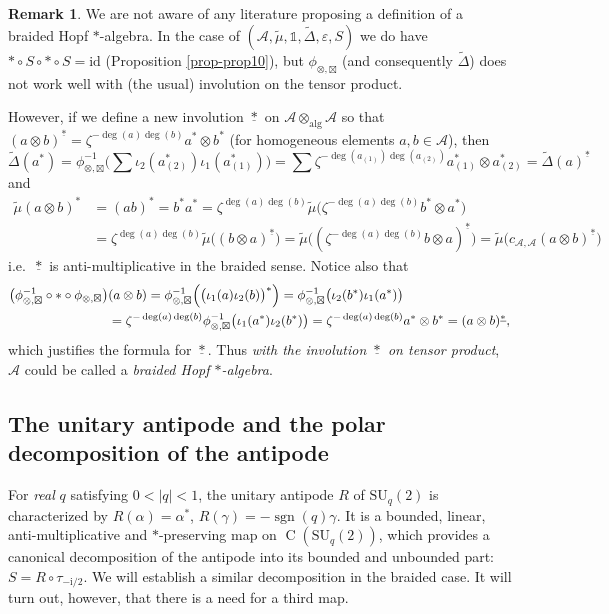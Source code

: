 \documentclass[12pt,reqno,a4paper]{amsart}
\theoremstyle{definition}
\newtheorem{remark}[proposition]{Remark}
\newcommand{\comp}{\circ}
\newcommand{\eps}{\varepsilon}
\newcommand{\I}{\mathds{1}}
\newcommand{\id}{\mathrm{id}}
\newcommand{\ii}{\mathrm{i}}
\newcommand{\tens}{\otimes}
\newcommand{\algtens}{\otimes_{\textrm{alg}}}
\newcommand{\cA}{\mathscr{A}}
\DeclareMathOperator{\C}{C}
\newcommand{\SU}{\mathrm{SU}}
\numberwithin{equation}{section}
\begin{document}
\begin{remark}
We are not aware of any literature proposing a definition of a braided Hopf $*$-algebra. In the case of $(\cA,\widetilde{\mu},\I,\widetilde{\Delta},\eps,S)$ we do have $*\comp S\comp *\comp S=\id$ (Proposition \ref{prop-prop10}), but $\phi_{\tens,\boxtimes}$ (and consequently $\widetilde{\Delta}$) does not work well with (the usual) involution on the tensor product.

However, if we define a new involution $\underline{\ast}$ on $\cA\algtens\cA$ so that $(a\tens b)^{\underline{\ast}}=\zeta^{-\deg(a)\deg(b)}a^*\tens b^*$ (for homogeneous elements $a,b\in\cA$), then
\[
\widetilde{\Delta}(a^*)
=\phi_{\tens,\boxtimes}^{-1}\biggl(\sum\iota_2(a_{(2)}^*)\iota_1(a_{(1)}^*)\biggr)
=\sum\zeta^{-\deg(a_{(1)})\deg(a_{(2)})}a_{(1)}^*\tens a_{(2)}^*
=\widetilde{\Delta}(a)^{\underline{\ast}}
\]
and
\begin{align*}
\widetilde{\mu}(a\tens b)^*&=(ab)^*=b^*a^*=
\zeta^{\deg(a)\deg(b)}\widetilde{\mu}\bigl(\zeta^{-\deg(a)\deg(b)} b^*\tens a^*\bigr)\\
&=\zeta^{\deg(a)\deg(b)}\widetilde{\mu}\bigl((b\tens a)^{\underline{\ast}}\bigr)
=\widetilde{\mu}\bigl(
(\zeta^{-\deg(a)\deg(b)}b\tens a)^{\underline{\ast}}\bigr)
=\widetilde{\mu}\bigl(
c_{\cA,\cA}(a\tens b)^{\underline{\ast}}\bigr)
\end{align*}
i.e.~$\underline{\ast}$ is anti-multiplicative in the braided sense.
Notice also that
\begin{align*}
\bigl(\phi_{\tens,\boxtimes}^{-1}\comp\ast\comp\phi_{\tens,\boxtimes}\bigr)&(a\tens b)
=\phi_{\tens,\boxtimes}^{-1}\Bigl(\bigl(\iota_1(a)\iota_2(b)\bigr)^*\Bigr)=
\phi_{\tens,\boxtimes}^{-1}\bigl(\iota_2(b^*)\iota_1(a^*)\bigr)\\
&=\zeta^{-\deg(a)\deg(b)}
\phi_{\tens,\boxtimes}^{-1}\bigl(\iota_1(a^*)\iota_2(b^*)\bigr)=
\zeta^{-\deg(a)\deg(b)}a^*\tens b^*=(a\tens b)^{\underline{\ast}},
\end{align*}
which justifies the formula for $\underline{\ast}$. Thus \emph{with the involution $\underline{\ast}$ on tensor product}, $\cA$ could be called a \emph{braided Hopf $*$-algebra}.
\end{remark}

\subsection{The unitary antipode and the polar decomposition of the antipode}\label{sect-UApolar}

For \emph{real} $q$ satisfying $0<|q|<1$, the unitary antipode $R$ of $\SU_q(2)$ is characterized by $R(\alpha)=\alpha^*$, $R(\gamma)=-\operatorname{sgn}(q)\gamma$. It is a bounded, linear, anti-multiplicative and $*$-preserving map on $\C(\SU_q(2))$, which provides a canonical decomposition of the antipode into its bounded and unbounded part: $S=R\comp\tau_{-\ii/2}$. We will establish a similar decomposition in the braided case. It will turn out, however, that there is a need for a third map.
\end{document}
